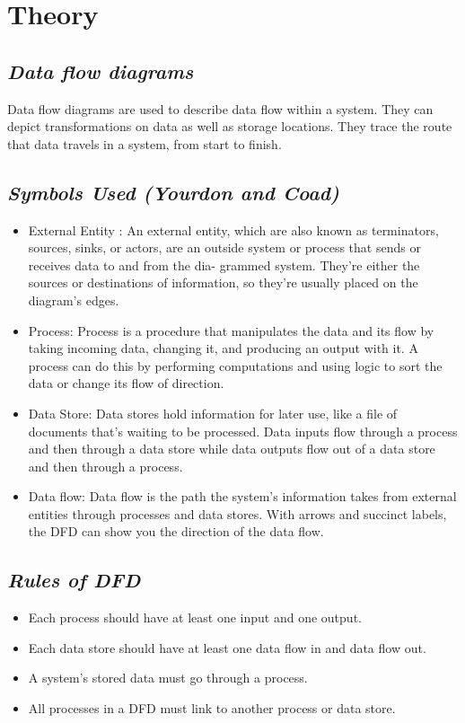 \documentclass{article}
\begin{document}
\section{\textbf{Theory}}
\subsection{\textbf{\textit{Data flow diagrams}}}
Data flow diagrams are used to describe data flow within a system. They can depict transformations on data as well as storage locations. They trace the route that data travels in a system, from start to finish.
\subsection{\textbf{\textit{Symbols Used (Yourdon and Coad)}}}
\begin{itemize}
	\item External Entity : An external entity, which are also known as terminators, sources, sinks, or actors, are an outside system or process that sends or receives data to and from the dia- grammed system. They’re either the sources or destinations of information, so they’re usually placed on the diagram’s edges.
	\item Process: Process is a procedure that manipulates the data and its flow by taking incoming data, changing it, and producing an output with it. A process can do this by performing computations and using logic to sort the data or change its flow of direction.
	\item Data Store: Data stores hold information for later use, like a file of documents that’s waiting to be processed. Data inputs flow through a process and then through a data store while data outputs flow out of a data store and then through a process.
	\item Data flow: Data flow is the path the system’s information takes from external entities through processes and data stores. With arrows and succinct labels, the DFD can show you the direction of the data flow.
\end{itemize}
\subsection{\textbf{\textit{Rules of DFD}}}
\begin{itemize}
	\item Each process should have at least one input and one output.
	\item Each data store should have at least one data flow in and data flow out.
	\item A system’s stored data must go through a process.
	\item All processes in a DFD must link to another process or data store.
\end{itemize}
\end{document}
